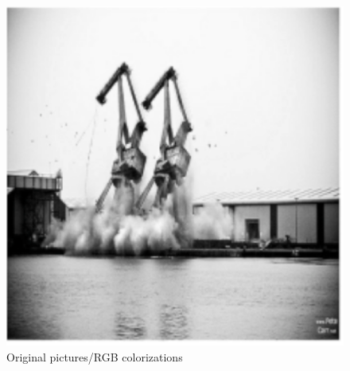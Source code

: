 \documentclass[]{article}
\begin{document}
\begin{figure}[H]
		\includegraphics[scale=0.35]{orig_3.png}
		\caption{Original pictures/RGB colorizations}
	\end{figure}
	
\end{document}
